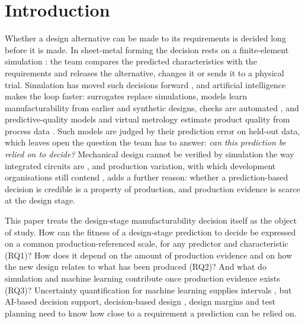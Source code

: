 \documentclass[pdflatex,sn-basic,lineno]{sn-jnl}
\begin{document}
\section{Introduction}\label{sec:intro}

Whether a design alternative can be made to its requirements is decided long before it is made. In sheet-metal forming the decision rests on a finite-element simulation \citep{banabic2010sheet}: the team compares the predicted characteristics with the requirements and releases the alternative, changes it or sends it to a physical trial. Simulation has moved such decisions forward \citep{thomke1998simulation}, and artificial intelligence makes the loop faster: surrogates replace simulations, models learn manufacturability from earlier and synthetic designs, checks are automated \citep{yan2026machine, ghadai2018learning, zhang2018featurenet, ballegeer2026bendfm}, and predictive-quality models and virtual metrology estimate product quality from process data \citep{tercan2022machine, dreyfus2022virtual}. Such models are judged by their prediction error on held-out data, which leaves open the question the team has to answer: \emph{can this prediction be relied on to decide?} Mechanical design cannot be verified by simulation the way integrated circuits are \citep{whitney1996why}, and production variation, with which development organisations still contend \citep{thornton2000more}, adds a further reason: whether a prediction-based decision is credible is a property of production, and production evidence is scarce at the design stage.

This paper treats the design-stage manufacturability decision itself as the object of study. How can the fitness of a design-stage prediction to decide be expressed on a common production-referenced scale, for any predictor and characteristic (RQ1)? How does it depend on the amount of production evidence and on how the new design relates to what has been produced (RQ2)? And what do simulation and machine learning contribute once production evidence exists (RQ3)? Uncertainty quantification for machine learning supplies intervals \citep{nemani2023uncertainty}, but AI-based decision support, decision-based design \citep{hazelrigg1998framework}, design margins \citep{eckert2019design} and test planning \citep{thomke2001sequential, salado2018mathematical, tahera2019testing} need to know how close to a requirement a prediction can be relied on.
\end{document}
